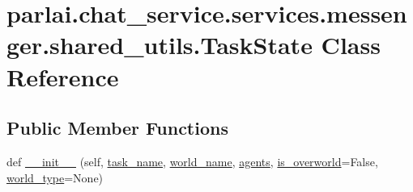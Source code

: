 \hypertarget{classparlai_1_1chat__service_1_1services_1_1messenger_1_1shared__utils_1_1TaskState}{}\section{parlai.\+chat\+\_\+service.\+services.\+messenger.\+shared\+\_\+utils.\+Task\+State Class Reference}
\label{classparlai_1_1chat__service_1_1services_1_1messenger_1_1shared__utils_1_1TaskState}
\subsection*{Public Member Functions}
\begin{DoxyCompactItemize}
\item 
def \hyperlink{classparlai_1_1chat__service_1_1services_1_1messenger_1_1shared__utils_1_1TaskState_af134b6fb0f8a86f34b3c3d2c17d18dc1}{\+\_\+\+\_\+init\+\_\+\+\_\+} (self, \hyperlink{classparlai_1_1chat__service_1_1services_1_1messenger_1_1shared__utils_1_1TaskState_a34a947c51b78f84f79de8e87d8e1cf5b}{task\+\_\+name}, \hyperlink{classparlai_1_1chat__service_1_1services_1_1messenger_1_1shared__utils_1_1TaskState_a83fab38feda407c392bd8ea32eb19607}{world\+\_\+name}, \hyperlink{classparlai_1_1chat__service_1_1services_1_1messenger_1_1shared__utils_1_1TaskState_a2e39f33ab663bb7345223e90f0dd530d}{agents}, \hyperlink{classparlai_1_1chat__service_1_1services_1_1messenger_1_1shared__utils_1_1TaskState_ad19ea555a240eec41329931887b93475}{is\+\_\+overworld}=False, \hyperlink{classparlai_1_1chat__service_1_1services_1_1messenger_1_1shared__utils_1_1TaskState_a10ad5170d1a6686bed914cb5b070fc6c}{world\+\_\+type}=None)
\end{DoxyCompactItemize}
